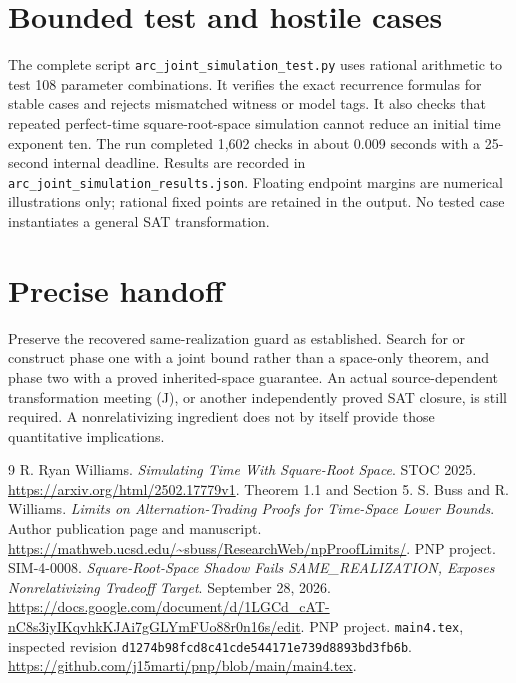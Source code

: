 \documentclass[11pt]{article}
\begin{document}
\section{Bounded test and hostile cases}
The complete script \texttt{arc\_joint\_simulation\_test.py} uses rational
arithmetic to test 108 parameter combinations. It verifies the exact
recurrence formulas for stable cases and rejects mismatched witness or
model tags. It also checks that repeated perfect-time square-root-space
simulation cannot reduce an initial time exponent ten. The run completed
1,602 checks in about 0.009 seconds with a 25-second internal deadline.
Results are recorded in \texttt{arc\_joint\_simulation\_results.json}.
Floating endpoint margins are numerical illustrations only; rational fixed
points are retained in the output. No tested case instantiates a general
SAT transformation.

\section{Precise handoff}
Preserve the recovered same-realization guard as established. Search for or
construct phase one with a joint bound rather than a space-only theorem,
and phase two with a proved inherited-space guarantee. An actual
source-dependent transformation meeting (J), or another independently proved
SAT closure, is still required. A nonrelativizing ingredient does not by
itself provide those quantitative implications.

\begin{thebibliography}{9}
 R. Ryan Williams.
\emph{Simulating Time With Square-Root Space}. STOC 2025.
\url{https://arxiv.org/html/2502.17779v1}. Theorem 1.1 and Section 5.
 S. Buss and R. Williams.
\emph{Limits on Alternation-Trading Proofs for Time-Space Lower Bounds}.
Author publication page and manuscript.
\url{https://mathweb.ucsd.edu/~sbuss/ResearchWeb/npProofLimits/}.
 PNP project. SIM-4-0008.
\emph{Square-Root-Space Shadow Fails SAME\_REALIZATION, Exposes Nonrelativizing Tradeoff Target}.
September 28, 2026.
\url{https://docs.google.com/document/d/1LGCd_cAT-nC8s3iyIKqvhkKJAi7gGLYmFUo88r0n16s/edit}.
 PNP project. \texttt{main4.tex}, inspected revision
\texttt{d1274b98fcd8c41cde544171e739d8893bd3fb6b}.
\url{https://github.com/j15marti/pnp/blob/main/main4.tex}.
\end{thebibliography}
\end{document}
